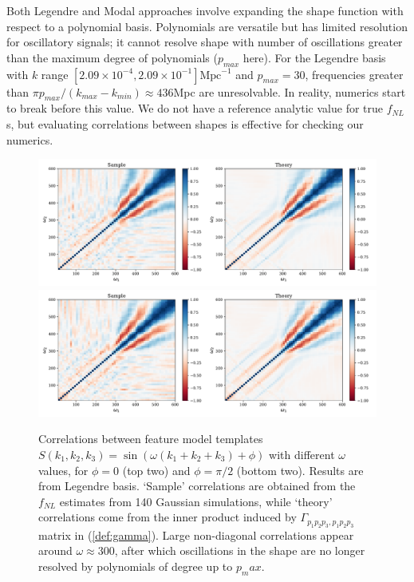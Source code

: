 Both Legendre and Modal approaches involve expanding the shape function with respect to a polynomial basis. Polynomials are versatile but has limited resolution for oscillatory signals; it cannot resolve shape with number of oscillations greater than the maximum degree of polynomials ($p_{max}$ here). For the Legendre basis with $k$ range $[2.09\times 10^{-4}, 2.09\times 10^{-1}]\text{Mpc}^{-1}$ and $p_{max}=30$, frequencies greater than $\pi p_{max} / (k_{max} - k_{min}) \approx 436$Mpc are unresolvable. In reality, numerics start to break before this value. We do not have a reference analytic value for true $f_{NL}$s, but evaluating correlations between shapes is effective for checking our numerics.

\begin{figure}[htbp!] 
	\centering    
	\includegraphics[width=\textwidth]{sine_template_correlations_new.pdf}
	\includegraphics[width=\textwidth]{cosine_template_correlations_new.pdf}
	\caption{Correlations between feature model templates $S(k_1,k_2,k_3)=\sin(\omega (k_1 + k_2 + k_3) + \phi)$ with different $\omega$ values, for $\phi = 0$ (top two) and $\phi = \pi/2$ (bottom two). Results are from Legendre basis. `Sample' correlations are obtained from the $f_{NL}$ estimates from 140 Gaussian simulations, while `theory' correlations come from the inner product induced by $\Gamma_{p_1 p_2 p_3, p_1 p_2 p_3}$ matrix in (\ref{def:gamma}). Large non-diagonal correlations appear around $\omega \approx 300$, after which oscillations in the shape are no longer resolved by polynomials of degree up to $p_max$.}
	\label{fig:feature_template_correlations}
\end{figure}

